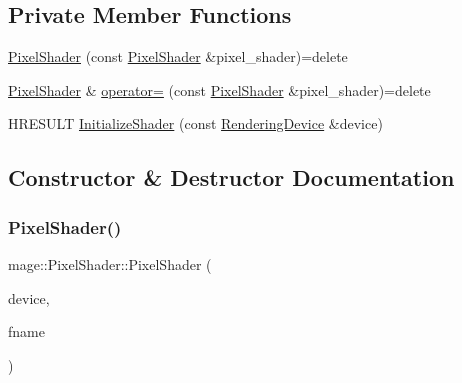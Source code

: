 \subsection*{Private Member Functions}
\begin{DoxyCompactItemize}
\item 
\hyperlink{classmage_1_1_pixel_shader_a361df943e40e9015ac4b769af130ce79}{Pixel\+Shader} (const \hyperlink{classmage_1_1_pixel_shader}{Pixel\+Shader} \&pixel\+\_\+shader)=delete
\item 
\hyperlink{classmage_1_1_pixel_shader}{Pixel\+Shader} \& \hyperlink{classmage_1_1_pixel_shader_ac3a3535b2751237f4aad110dca05d0c3}{operator=} (const \hyperlink{classmage_1_1_pixel_shader}{Pixel\+Shader} \&pixel\+\_\+shader)=delete
\item 
H\+R\+E\+S\+U\+LT \hyperlink{classmage_1_1_pixel_shader_a8a16c2b5d25427fdb5675b1b2be4cbfd}{Initialize\+Shader} (const \hyperlink{classmage_1_1_rendering_device}{Rendering\+Device} \&device)
\end{DoxyCompactItemize}


\subsection{Constructor \& Destructor Documentation}
\hypertarget{classmage_1_1_pixel_shader_a9a31af122003b6672ded3912f29109df}{}\label{classmage_1_1_pixel_shader_a9a31af122003b6672ded3912f29109df} 
\subsubsection{\texorpdfstring{Pixel\+Shader()}{PixelShader()}\hspace{0.1cm}{\footnotesize\ttfamily [1/2]}}
{\footnotesize\ttfamily mage\+::\+Pixel\+Shader\+::\+Pixel\+Shader (\begin{DoxyParamCaption}\item[{const \hyperlink{classmage_1_1_rendering_device}{Rendering\+Device} \&}]{device,  }\item[{const wstring \&}]{fname }\end{DoxyParamCaption})}

\hypertarget{classmage_1_1_pixel_shader_ac339b9196db24d18143ad36013d598b2}{}\label{classmage_1_1_pixel_shader_ac339b9196db24d18143ad36013d598b2} 
